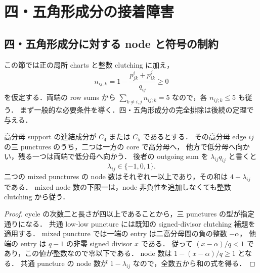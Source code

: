 \section{四・五角形成分の接着障害}\label{cy12:section}


\subsection{四・五角形成分に対する node と符号の制約}
\label{cn12:section}

この節では正の局所 charts と整数 clutching に加え，
\begin{equation}\label{cn12:node-convention}
 n_{ij;k}=1-\frac{p^i_{jk}+p^j_{ik}}{q_{ij}}\geq0
\end{equation}
を仮定する．両端の row sums から $\sum_{k\ne i,j}n_{ij;k}=5$ なので，各 $n_{ij;k}\leq5$ も従う．
まず一般的な必要条件を導く．四・五角形成分の完全排除は後続の定理で与える．

\begin{lemma}\label{cn12:three-punctures}
高分母 support の連結成分が $C_4$ または $C_5$ であるとする．
その高分母 edge $ij$ の三 punctures のうち，二つは一方の core で高分母へ，
他方で低分母へ向かい，残る一つは両端で低分母へ向かう．
後者の outgoing sum を $\lambda_{ij}q_{ij}$ と書くと
\[
 \lambda_{ij}\in\{-1,0,1\}.
\]
二つの mixed punctures の node 数はそれぞれ一以上であり，その和は $4+\lambda_{ij}$ である．
mixed node 数の下限一は，node 非負性を追加しなくても整数 clutching から従う．
\end{lemma}

\begin{proof}
cycle の次数二と長さが四以上であることから，三 punctures の型が指定通りになる．
共通 low-low puncture には既知の signed-divisor clutching 補題を適用する．
mixed puncture では一端の entry は二高分母間の負の整数 $-\alpha$，
他端の entry は $q-1$ の非零 signed divisor $x$ である．
従って $(x-\alpha)/q<1$ であり，この値が整数なので零以下である．
node 数は $1-(x-\alpha)/q\geq1$ となる．
共通 puncture の node 数が $1-\lambda_{ij}$ なので，全数五から和の式を得る．
\end{proof}

